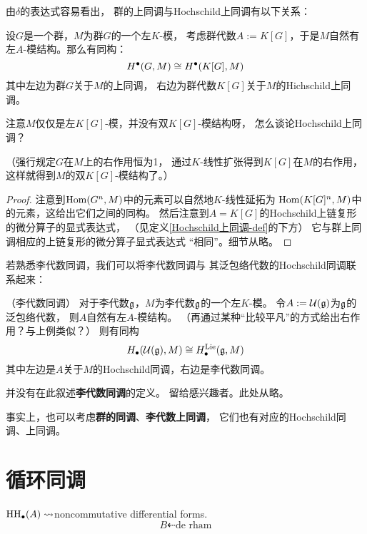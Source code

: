 由$\delta$的表达式容易看出，
群的上同调与Hochschild上同调有以下关系：

\begin{prop}设$G$是一个群，$M$为群$G$的一个左$K$-模，
考虑群代数$A:=K[G]$，于是$M$自然有左$A$-模结构。那么有同构：
$$H^{\bullet}(G,M)\cong H^{\bullet}(K[G],M)$$
其中左边为群$G$关于$M$的上同调，
右边为群代数$K[G]$关于$M$的Hichschild上同调。
\end{prop}

{\color{red}
注意$M$仅仅是左$K[G]$-模，并没有双$K[G]$-模结构呀，
怎么谈论Hochschild上同调？

\color{purple}
（强行规定$G$在$M$上的右作用恒为1，
通过$K$-线性扩张得到$K[G]$在$M$的右作用，
这样就得到$M$的双$K[G]$-模结构了。）}

\begin{proof}
注意到$\operatorname{Hom}(G^n,M)$中的元素可以自然地$K$-线性延拓为
$\operatorname{Hom}(K[G]^n,M)$中的元素，这给出它们之间的同构。
然后注意到$A=K[G]$的Hochschild上链复形的微分算子的显式表达式，
（见定义\ref{Hochschild上同调-def}的下方）
它与群上同调相应的上链复形的微分算子显式表达式
“相同”。细节从略。
\end{proof}

若熟悉李代数同调，我们可以将李代数同调与
其泛包络代数的Hochschild同调联系起来：

\begin{example}（李代数同调）%
对于李代数$\mathfrak{g}$，$M$为李代数$\mathfrak{g}$的一个左$K$-模。
令$A:=\mathcal{U}(\mathfrak{g})$为$\mathfrak{g}$的泛包络代数，
则$A$自然有左$A$-模结构。
（再通过某种“比较平凡”的方式给出右作用？与上例类似？）
则有同构
$$H_{\bullet}(\mathcal{U}(\mathfrak{g}),M)
\cong H^{\text{Lie}}_{\bullet}(\mathfrak{g},M)$$
其中左边是$A$关于$M$的Hochschild同调，右边是李代数同调。
\end{example}

并没有在此叙述\textbf{李代数同调}的定义。
留给感兴趣者。此处从略。

事实上，也可以考虑\textbf{群的同调}、\textbf{李代数上同调}，
它们也有对应的Hochschild同调、上同调。

\section{循环同调}

$\operatorname{HH}_{\bullet}(A)\rightsquigarrow$noncommutative differential forms.
$$B\dashleftarrow\text{de rham}$$


